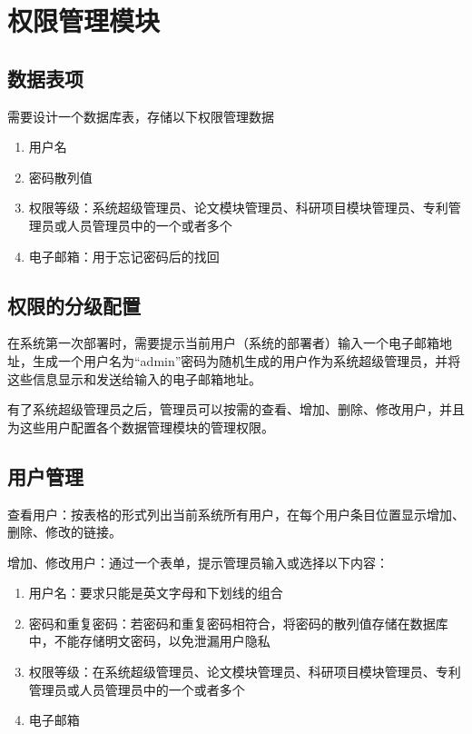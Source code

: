 \section{权限管理模块}
\subsection{数据表项}
需要设计一个数据库表，存储以下权限管理数据

\begin{enumerate}
\item 用户名
\item 密码散列值
\item 权限等级：系统超级管理员、论文模块管理员、科研项目模块管理员、专利管理员或人员管理员中的一个或者多个
\item 电子邮箱：用于忘记密码后的找回
\end{enumerate}

\subsection{权限的分级配置}

在系统第一次部署时，需要提示当前用户（系统的部署者）输入一个电子邮箱地址，生成一个用户名为“admin”密码为随机生成的用户作为系统超级管理员，并将这些信息显示和发送给输入的电子邮箱地址。

有了系统超级管理员之后，管理员可以按需的查看、增加、删除、修改用户，并且为这些用户配置各个数据管理模块的管理权限。

\subsection{用户管理}

查看用户：按表格的形式列出当前系统所有用户，在每个用户条目位置显示增加、删除、修改的链接。

增加、修改用户：通过一个表单，提示管理员输入或选择以下内容：

\begin{enumerate}
\item 用户名：要求只能是英文字母和下划线的组合
\item 密码和重复密码：若密码和重复密码相符合，将密码的散列值存储在数据库中，不能存储明文密码，以免泄漏用户隐私
\item 权限等级：在系统超级管理员、论文模块管理员、科研项目模块管理员、专利管理员或人员管理员中的一个或者多个
\item 电子邮箱
\end{enumerate}

